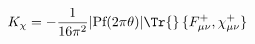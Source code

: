 \begin{equation}
 K_\chi=-\frac{1}{16\pi^2}|\text{Pf}(2\pi\theta)|
 \Tr{}\,\{F^+_{\mu\nu},\chi^+_{\mu\nu}\}
\end{equation}

